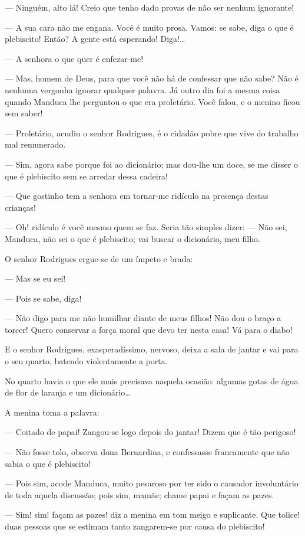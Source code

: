 --- Ninguém, alto lá! Creio que tenho dado provas de não ser nenhum
ignorante!

--- A sua cara não me engana. Você é muito prosa. Vamos: se sabe, diga o
que é plebiscito! Então? A gente está esperando! Diga!\ldots{}

--- A senhora o que quer é enfezar-me!

--- Mas, homem de Deus, para que você não há de confessar que não sabe?
Não é nenhuma vergonha ignorar qualquer palavra. Já outro dia foi a
mesma coisa quando Manduca lhe perguntou o que era proletário. Você
falou, e o menino ficou sem saber!

--- Proletário, acudiu o senhor Rodrigues, é o cidadão pobre que vive do
trabalho mal remunerado.

--- Sim, agora sabe porque foi ao dicionário; mas dou-lhe um doce, se me
disser o que é plebiscito sem se arredar dessa cadeira!

--- Que gostinho tem a senhora em tornar-me ridículo na presença destas
crianças!

--- Oh! ridículo é você mesmo quem se faz. Seria tão simples dizer: ---
Não sei, Manduca, não sei o que é plebiscito; vai buscar o dicionário,
meu filho.

O senhor Rodrigues ergue-se de um ímpeto e brada:

--- Mas se eu sei!

--- Pois se sabe, diga!

--- Não digo para me não humilhar diante de meus filhos! Não dou o braço
a torcer! Quero conservar a força moral que devo ter nesta casa! Vá para
o diabo!

E o senhor Rodrigues, exasperadíssimo, nervoso, deixa a sala de jantar e
vai para o seu quarto, batendo violentamente a porta.

No quarto havia o que ele mais precisava naquela ocasião: algumas gotas
de água de flor de laranja e um dicionário\ldots{}

A menina toma a palavra:

--- Coitado de papai! Zangou-se logo depois do jantar! Dizem que é tão
perigoso!

--- Não fosse tolo, observa dona Bernardina, e confessasse francamente
que não sabia o que é plebiscito!

--- Pois sim, acode Manduca, muito pesaroso por ter sido o causador
involuntário de toda aquela discussão; pois sim, mamãe; chame papai e
façam as pazes.

--- Sim! sim! façam as pazes! diz a menina em tom meigo e suplicante.
Que tolice! duas pessoas que se estimam tanto zangarem-se por causa do
plebiscito!

